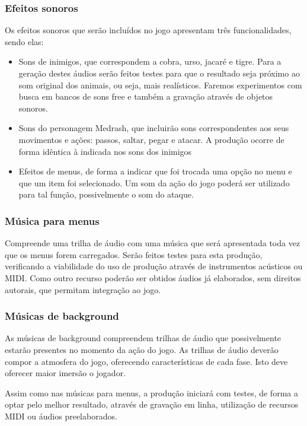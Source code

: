 \subsubsection{Efeitos sonoros}
Os efeitos sonoros que serão incluídos no jogo apresentam três funcionalidades, sendo elas:
\begin{itemize}
\item Sons de inimigos, que correspondem a cobra, urso, jacaré e tigre. Para a geração destes áudios serão feitos testes para que o resultado seja próximo ao som original dos animais, ou seja, mais realísticos. Faremos experimentos com busca em bancos de sons free e também a gravação através de objetos sonoros. 
\item Sons do personagem Medrash, que incluirão sons correspondentes aos seus movimentos e ações: passos, saltar, pegar e atacar. A produção ocorre de forma idêntica à indicada nos sons dos inimigos
\item Efeitos de menus, de forma a indicar que foi trocada uma opção no menu e que um item foi selecionado. Um som da ação do jogo poderá ser utilizado para tal função, possivelmente o som do ataque.
\end{itemize}

\subsubsection{Música para menus}
Compreende uma trilha de áudio com uma música que será apresentada toda vez que os menus forem carregados. Serão feitos testes para esta produção, verificando a viabilidade do uso de produção através de instrumentos acústicos ou MIDI. Como outro recurso poderão ser obtidos áudios já elaborados, sem direitos autorais, que permitam integração ao jogo.

\subsubsection{Músicas de background}
As músicas de background compreendem trilhas de áudio que possivelmente estarão presentes no momento da ação do jogo. As trilhas de áudio deverão compor a atmosfera do jogo, oferecendo características de cada fase. Isto deve oferecer maior imersão o jogador.

Assim como nas músicas para menus, a produção iniciará com testes, de forma a optar pelo melhor resultado, através de gravação em linha, utilização de recursos MIDI ou áudios preelaborados.
